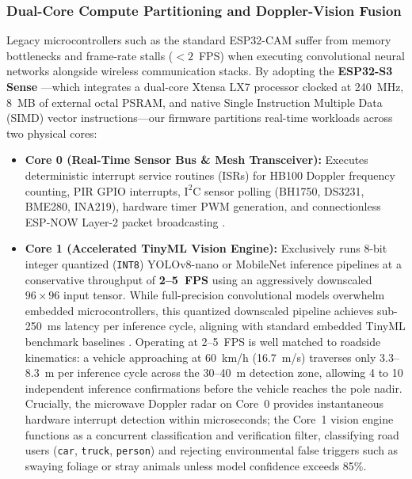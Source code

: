 \documentclass[11pt,a4paper]{article}
\begin{document}
\subsubsection{Dual-Core Compute Partitioning and Doppler-Vision Fusion}
Legacy microcontrollers such as the standard ESP32-CAM suffer from memory bottlenecks and frame-rate stalls (\(<2\)~FPS) when executing convolutional neural networks alongside wireless communication stacks. By adopting the \textbf{ESP32-S3 Sense} \cite{espressif_esp32s3}---which integrates a dual-core Xtensa LX7 processor clocked at 240~MHz, 8~MB of external octal PSRAM, and native Single Instruction Multiple Data (SIMD) vector instructions---our firmware partitions real-time workloads across two physical cores:
\begin{itemize}
    \item \textbf{Core 0 (Real-Time Sensor Bus \& Mesh Transceiver):} Executes deterministic interrupt service routines (ISRs) for HB100 Doppler frequency counting, PIR GPIO interrupts, \(\text{I}^2\text{C}\) sensor polling (BH1750, DS3231, BME280, INA219), hardware timer PWM generation, and connectionless ESP-NOW Layer-2 packet broadcasting \cite{espressif_espnow}.
    \item \textbf{Core 1 (Accelerated TinyML Vision Engine):} Exclusively runs 8-bit integer quantized (\texttt{INT8}) YOLOv8-nano \cite{redmon_yolo} or MobileNet \cite{howard2017mobilenets} inference pipelines at a conservative throughput of \textbf{2--5~FPS} using an aggressively downscaled \(96 \times 96\) input tensor. While full-precision convolutional models overwhelm embedded microcontrollers, this quantized downscaled pipeline achieves sub-250~ms latency per inference cycle, aligning with standard embedded TinyML benchmark baselines \cite{banbury2021benchmarking}. Operating at 2--5~FPS is well matched to roadside kinematics: a vehicle approaching at 60~km/h (16.7~m/s) traverses only 3.3--8.3~m per inference cycle across the 30--40~m detection zone, allowing 4 to 10 independent inference confirmations before the vehicle reaches the pole nadir. Crucially, the microwave Doppler radar on Core~0 provides instantaneous hardware interrupt detection within microseconds; the Core~1 vision engine functions as a concurrent classification and verification filter, classifying road users (\texttt{car}, \texttt{truck}, \texttt{person}) and rejecting environmental false triggers such as swaying foliage or stray animals unless model confidence exceeds 85\%.
\end{itemize}
\end{document}

